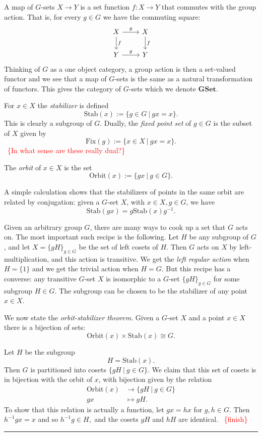 \documentclass[11pt,oneside]{article}
\newcommand{\todo}[1]{\ \textcolor{red}{\{#1\}}\ }
\newcommand{\Aut}{\mathrm{Aut}}
\newcommand{\Stab}{\mathrm{Stab}}
\newcommand{\Fix}{\mathrm{Fix}}
\newcommand{\Orbit}{\mathrm{Orbit}}
\newcommand\nounderline[1]{ #1}
\newcommand\dotheorem[1]{\vskip 5pt \noindent {\bf \underline{Theorem #1.}\ }}
\newcommand\doproof{\vskip 5pt \noindent{\bf \nounderline{Proof:}\ }}
\newcommand\tombstone{\rule{.36em}{2ex}\vskip 5pt}
\newcounter{numitem}
\newcommand{\numitem}[1]{\refstepcounter{numitem}\thenumitem\label{#1}}
\newcommand{\GSet}{\mathbf{GSet}}
\begin{document}
A map of $G$-sets $X\to Y$
is a set function $f:X\to Y$ that commutes with the group action.
That is, for every $g\in G$ we have the commuting square:
\[
\begin{tikzcd}
 X \arrow{d}{f} \arrow{r}{g} &  X \arrow{d}{f} \\
 Y \arrow{r}{g} &  Y 
\end{tikzcd}
\]
Thinking of $G$ as a one object category, a group action is
then a set-valued functor and we see that a map of $G$-sets
is the same as a natural transformation of functors.
This gives the category of $G$-sets which we denote $\GSet.$

For $x\in X$ the \emph{stabilizer} is defined
$$
    \Stab(x) := \{ g\in G \ | \ gx = x \}.
$$
This is clearly a subgroup of $G$.
Dually, 
the \emph{fixed point set} of $g\in G$
is the subset of $X$ given by
$$
    \Fix(g) := \{ x\in X \ | \ gx = x \}.
$$
\todo{In what sense are these really dual?}

The \emph{orbit} of $x\in X$ is the set
$$
    \Orbit(x) := \{ gx \ | \ g\in G \}.
$$

A simple calculation shows that the stabilizers of
points in the same orbit are related by conjugation:
given a $G$-set $X$, with $x\in X, g\in G$, we have
$$
    \Stab(gx) = g\Stab(x) g^{-1}.
$$

Given an arbitrary group $G$, 
there are many ways to cook up a set that $G$ acts on.
The most important such recipe is the following.
Let $H$ be any subgroup of $G$,
and let $X=\{gH\}_{g\in G}$ be the set of left cosets of $H$.
Then $G$ acts on $X$ by left-multiplication,
and this action is transitive.
We get the \emph{left regular action} when $H=\{1\}$ and
we get the trivial action when $H=G.$
But this recipe has a converse:
any transitive $G$-set $X$ is
isomorphic to a $G$-set $\{gH\}_{g\in G}$ for
some subgroup $H\in G.$
The subgroup can be chosen to be the
stabilizer of any point $x\in X.$

We now state the \emph{orbit-stabilizer theorem}.
\dotheorem{\numitem{thmOS}}%
Given a $G$-set $X$ and a point $x\in X$
there is a bijection of sets:
$$
    \Orbit(x) \times \Stab(x) \cong G.
$$

\doproof
Let $H$ be the subgroup
$$
    H = \Stab(x).
$$
Then $G$ is partitioned into cosets $\{gH\ |\ g\in G\}.$
We claim that this set of cosets is in bijection with
the orbit of $x$,
with bijection given by the relation
\begin{align*}
    \Orbit(x) &\to \{gH \ |\ g\in G\} \\
    gx  &\mapsto  gH.
\end{align*}
To show that this relation is actually a function,
let $gx=hx$ for $g,h\in G.$
Then $h^{-1}gx = x$ and so $h^{-1}g\in H,$
and the cosets $gH$ and $hH$ are identical.
\todo{finish}
\tombstone
\end{document}
